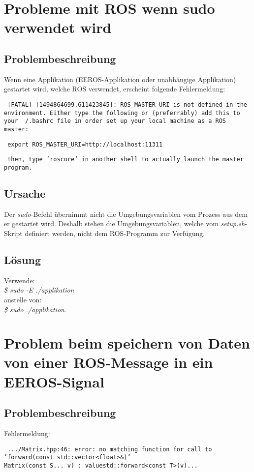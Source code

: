 \section{Probleme mit ROS wenn sudo verwendet wird}
\subsection{Problembeschreibung}
Wenn eine Applikation (EEROS-Applikation oder unabhängige Applikation) gestartet wird, welche ROS verwendet, erscheint folgende Fehlermeldung:


\texttt{
[FATAL] [1494864699.611423845]: ROS\_MASTER\_URI is not defined in the environment. Either type the following or (preferrably) add this to your ~/.bashrc file in order set up your local machine as a ROS master:
}

\texttt{
export ROS\_MASTER\_URI=http://localhost:11311
}

\texttt{
then, type 'roscore' in another shell to actually launch the master program.
}

\subsection{Ursache}
Der \textit{sudo}-Befehl übernimmt nicht die Umgebungsvariablen vom Prozess aus dem er gestartet wird.
Deshalb stehen die Umgebungsvariablen, welche vom \textit{setup.sh}-Skript definiert werden, nicht dem ROS-Programm zur Verfügung.

\subsection{Lösung}
Verwende: \\
\textit{\$ sudo -E ./applikation} \\
anstelle von: \\
\textit{\$ sudo ./applikation}.



\section{Problem beim speichern von Daten von einer ROS-Message in ein EEROS-Signal}

\subsection{Problembeschreibung}
Fehlermeldung:

\texttt{
.../Matrix.hpp:46: error: no matching function for call to \\
'forward(const std::vector<float>\&)' \\
\-\hspace{2cm} Matrix(const S... v) : value{std::forward<const T>(v)...} 
}

